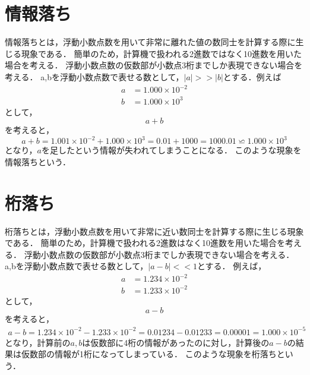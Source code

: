 \section{情報落ち}
情報落ちとは，浮動小数点数を用いて非常に離れた値の数同士を計算する際に生じる現象である．
簡単のため，計算機で扱われる2進数ではなく10進数を用いた場合を考える．
浮動小数点数の仮数部が小数点3桁までしか表現できない場合を考える．
a,bを浮動小数点数で表せる数として，$|a| >> |b|$とする．例えば
\begin{align}
    a &= 1.000 \times 10^{-2} \\
    b &= 1.000 \times 10^{3}
\end{align}
として，
\begin{equation}
    a + b
\end{equation}
を考えると，
\begin{equation}
    a + b = 1.001 \times 10^{-2} + 1.000 \times 10^{3} = 0.01 + 1000 = 1000.01 \backsimeq 1.000 \times 10^{3}
\end{equation}
となり，$a$を足したという情報が失われてしまうことになる．
このような現象を情報落ちという．

\section{桁落ち}
桁落ちとは，浮動小数点数を用いて非常に近い数同士を計算する際に生じる現象である．
簡単のため，計算機で扱われる2進数はなく10進数を用いた場合を考える．
浮動小数点数の仮数部が小数点3桁までしか表現できない場合を考える．
a,bを浮動小数点数で表せる数として，$|a - b| << 1$とする．
例えば，
\begin{align}
    a &= 1.234 \times 10^{-2} \\
    b &= 1.233 \times 10^{-2}
\end{align}
として，
\begin{equation}
    a - b
\end{equation}
を考えると，
\begin{align}
    a - b = 1.234 \times 10^{-2} - 1.233 \times 10^{-2} = 0.01234 - 0.01233 = 0.00001 = 1.000 \times 10^{-5}
\end{align}
となり，計算前の$a,b$は仮数部に4桁の情報があったのに対し，計算後の$a-b$の結果は仮数部の情報が1桁になってしまっている．
このような現象を桁落ちという．